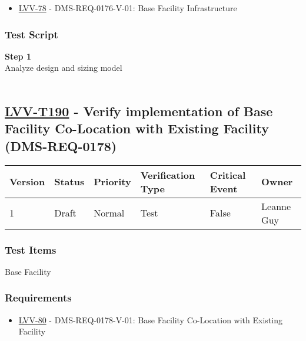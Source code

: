 \begin{itemize}
\tightlist
\item
  \href{https://jira.lsstcorp.org/browse/LVV-78}{LVV-78} -
  DMS-REQ-0176-V-01: Base Facility Infrastructure
\end{itemize}

\hypertarget{test-script-166}{%
\subsubsection{Test Script}\label{test-script-166}}

\textbf{Step 1}\\
Analyze design and sizing model\\
~\\

\hypertarget{lvv-t190---verify-implementation-of-base-facility-co-location-with-existing-facility-dms-req-0178}{%
\subsection{\texorpdfstring{\href{https://jira.lsstcorp.org/secure/Tests.jspa\#/testCase/LVV-T190}{LVV-T190}
- Verify implementation of Base Facility Co-Location with Existing
Facility
(DMS-REQ-0178)}{LVV-T190 - Verify implementation of Base Facility Co-Location with Existing Facility (DMS-REQ-0178)}}\label{lvv-t190---verify-implementation-of-base-facility-co-location-with-existing-facility-dms-req-0178}}

\begin{longtable}[]{@{}llllll@{}}
\toprule
Version & Status & Priority & Verification Type & Critical Event &
Owner\tabularnewline
\midrule
\endhead
1 & Draft & Normal & Test & False & Leanne Guy\tabularnewline
\bottomrule
\end{longtable}

\hypertarget{test-items-166}{%
\subsubsection{Test Items}\label{test-items-166}}

Base Facility~

\hypertarget{requirements-167}{%
\subsubsection{Requirements}\label{requirements-167}}

\begin{itemize}
\tightlist
\item
  \href{https://jira.lsstcorp.org/browse/LVV-80}{LVV-80} -
  DMS-REQ-0178-V-01: Base Facility Co-Location with Existing Facility
\end{itemize}

